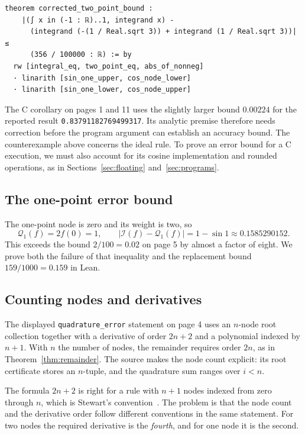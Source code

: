 \documentclass[11pt]{article}
\newcommand{\I}{\mathcal{I}}
\newcommand{\Q}{\mathcal{Q}}
\newcommand{\code}[1]{%
  \ifmmode\text{\texttt{\detokenize{#1}}}\else\nolinkurl{#1}\fi}
\begin{document}
\begin{lstlisting}[language=Lean,float=htbp,
  caption={The corrected two-point bound, from \code{Quadrature.Examples.TwoPointCosine}.
  The enclosure lemmas are proved earlier in the same module.},
  label={lst:lean-bound}]
theorem corrected_two_point_bound :
    |(∫ x in (-1 : ℝ)..1, integrand x) -
      (integrand (-(1 / Real.sqrt 3)) + integrand (1 / Real.sqrt 3))| ≤
      (356 / 100000 : ℝ) := by
  rw [integral_eq, two_point_eq, abs_of_nonneg]
  · linarith [sin_one_upper, cos_node_lower]
  · linarith [sin_one_lower, cos_node_upper]
\end{lstlisting}

The C corollary on pages 1 and 11 uses the slightly larger bound $0.00224$
for the reported result \code{0.83791182769499317}. Its analytic premise
therefore needs correction before the program argument can establish an
accuracy bound. The counterexample above concerns the ideal rule. To prove
an error bound for a C execution, we must also account for its cosine
implementation and rounded operations, as in
Sections~\ref{sec:floating} and~\ref{sec:programs}.

\subsection{The one-point error bound}

The one-point node is zero and its weight is two, so
\[
  \Q_1(f)=2f(0)=1,\qquad
  |\I(f)-\Q_1(f)|=1-\sin1\approx0.1585290152.
\]
This exceeds the bound $2/100=0.02$ on page 5 by almost a factor of eight. We
prove both the failure of that inequality and the replacement bound
$159/1000=0.159$ in Lean.

\subsection{Counting nodes and derivatives}

The displayed \code{quadrature_error} statement on page 4 uses an $n$-node
root collection together with a derivative of order $2n+2$ and a polynomial
indexed by $n+1$. With $n$ the number of nodes, the remainder requires
order $2n$, as in Theorem~\ref{thm:remainder}. The source makes the node
count explicit: its root certificate stores an $n$-tuple, and the
quadrature sum ranges over $i<n$.

The formula $2n+2$ is right for a rule with $n+1$ nodes indexed from zero
through $n$, which is Stewart's convention~\cite{stewart}. The problem is
that the node count and the derivative order follow different conventions
in the same statement. For two nodes the required derivative is the
\emph{fourth}, and for one node it is the second.
\end{document}
